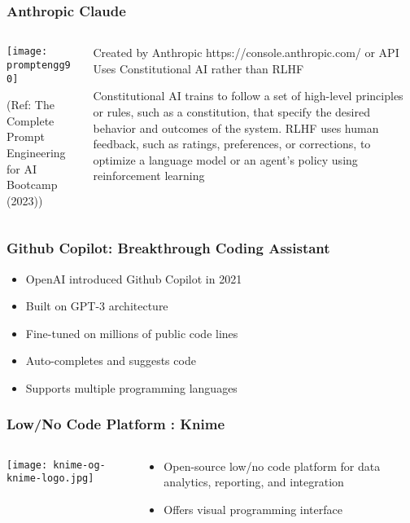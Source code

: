\begin{frame}[fragile]\frametitle{Anthropic Claude}


\begin{columns}
    \begin{column}[T]{0.6\linewidth}
		\begin{center}
		\texttt{[image: promptengg90]}

		{\tiny (Ref: The Complete Prompt Engineering for AI Bootcamp (2023))}
		\end{center}	
    \end{column}
    \begin{column}[T]{0.4\linewidth}
		Created by Anthropic 
		https://console.anthropic.com/ or API
		Uses Constitutional AI rather than RLHF
		
		Constitutional AI trains to follow a set of high-level principles or rules, such as a constitution, that specify the desired behavior and outcomes of the system.
		RLHF uses human feedback, such as ratings, preferences, or corrections, to optimize a language model or an agent’s policy using reinforcement learning
    \end{column}
  \end{columns}
\end{frame}

\begin{frame}[fragile]\frametitle{Github Copilot: Breakthrough Coding Assistant}
    
    \begin{itemize}
        \item OpenAI introduced Github Copilot in 2021
        \item Built on GPT-3 architecture
        \item Fine-tuned on millions of public code lines
        \item Auto-completes and suggests code
        \item Supports multiple programming languages
    \end{itemize}
\end{frame}

\begin{frame}[fragile]\frametitle{Low/No Code Platform : Knime}
\begin{columns}[T]
\begin{column}{.48\textwidth}
\texttt{[image: knime-og-knime-logo.jpg]}
\end{column}
\begin{column}{.48\textwidth}
\begin{itemize}
\item Open-source low/no code platform for data analytics, reporting, and integration
\item Offers visual programming interface
\end{itemize}
\end{column}
\end{columns}
\end{frame}

